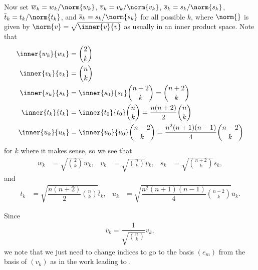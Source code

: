Now set $\overline w_k = w_k/\norm{w_k}$, $\overline v_k = v_k/\norm{v_k}$, $\overline s_k = s_k/\norm{s_k}$, $\overline t_k = t_k/\norm{t_k}$, and $\overline s_k = s_k/\norm{s_k}$ for all possible $k$, where $\norm{}$ is given by $\norm{v}=\sqrt{\inner{v}{v}}$ as usually in an inner product space. Note that 
\begin{align*}
  \inner{w_k}{w_k} &= \binom{2}{k} \\
  \inner{v_k}{v_k} &= \binom{n}{k} \\
  \inner{s_k}{s_k} &= \inner{s_0}{s_0}\binom{n+2}{k} = \binom{n+2}{k} \\
  \inner{t_k}{t_k} &= \inner{t_0}{t_0}\binom{n}{k} = \dfrac{n(n+2)}{2}\binom{n}{k} \\
  \inner{u_k}{u_k} &= \inner{u_0}{u_0}\binom{n-2}{k} = \dfrac{n^2(n+1)(n-1)}{4}\binom{n-2}{k}
\end{align*}
for $k$ where it makes sense, so we see that
\begin{align}\label{eq:normedbases1}
  w_k &= \sqrt{\binom{2}{k}}\overline w_k, & v_k &= \sqrt{\binom{n}{k}}\overline v_k, & s_k &= \sqrt{\binom{n+2}{k}}\overline s_k,
\end{align}
and
\begin{align}\label{eq:normedbases2}
  t_k &= \sqrt{\dfrac{n(n+2)}{2}\binom{n}{k}}\overline t_k, & u_k &= \sqrt{\dfrac{n^2(n+1)(n-1)}{4}\binom{n-2}{k}}\overline u_k.
\end{align}

\begin{remark}\label{rem:changeindex}
  Since
  \begin{align*}
    \overline v_k = \dfrac{1}{\sqrt{\binom{n}{k}}} v_k,
  \end{align*}
  we note that we just need to change indices to go to the basis $(e_m)$ from the basis of $(v_k)$ as in the work leading to .
\end{remark}

